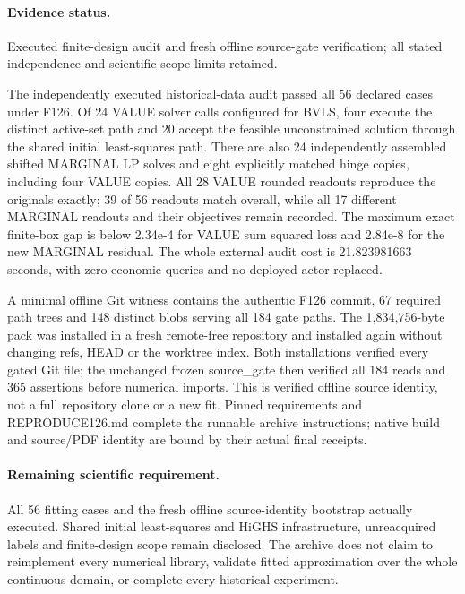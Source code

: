 \paragraph{Evidence status.} Executed finite-design audit and fresh offline source-gate verification; all stated independence and scientific-scope limits retained.

The independently executed historical-data audit passed all 56 declared cases under F126. Of 24 VALUE solver calls configured for BVLS, four execute the distinct active-set path and 20 accept the feasible unconstrained solution through the shared initial least-squares path. There are also 24 independently assembled shifted MARGINAL LP solves and eight explicitly matched hinge copies, including four VALUE copies. All 28 VALUE rounded readouts reproduce the originals exactly; 39 of 56 readouts match overall, while all 17 different MARGINAL readouts and their objectives remain recorded. The maximum exact finite-box gap is below 2.34e-4 for VALUE sum squared loss and 2.84e-8 for the new MARGINAL residual. The whole external audit cost is 21.823981663 seconds, with zero economic queries and no deployed actor replaced.\par
A minimal offline Git witness contains the authentic F126 commit, 67 required path trees and 148 distinct blobs serving all 184 gate paths. The 1,834,756-byte pack was installed in a fresh remote-free repository and installed again without changing refs, HEAD or the worktree index. Both installations verified every gated Git file; the unchanged frozen source\_gate then verified all 184 reads and 365 assertions before numerical imports. This is verified offline source identity, not a full repository clone or a new fit. Pinned requirements and REPRODUCE126.md complete the runnable archive instructions; native build and source/PDF identity are bound by their actual final receipts.\par

\paragraph{Remaining scientific requirement.} All 56 fitting cases and the fresh offline source-identity bootstrap actually executed. Shared initial least-squares and HiGHS infrastructure, unreacquired labels and finite-design scope remain disclosed. The archive does not claim to reimplement every numerical library, validate fitted approximation over the whole continuous domain, or complete every historical experiment.

